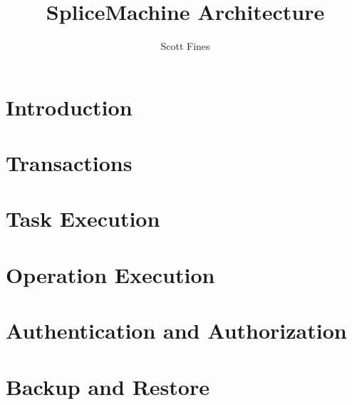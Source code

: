 \documentclass[10pt]{amsbook}
\begin{document}
\title{SpliceMachine Architecture}
\author{Scott Fines}

\maketitle
\begingroup
\let\clearpage\relax
\chapter*{Introduction}

\endgroup

\tableofcontents
\begingroup
\let\clearpage\relax
\chapter{Transactions}

\chapter{Task Execution}

\chapter{Operation Execution}

\chapter{Authentication and Authorization}

\chapter{Backup and Restore}


\endgroup
\end{document}
